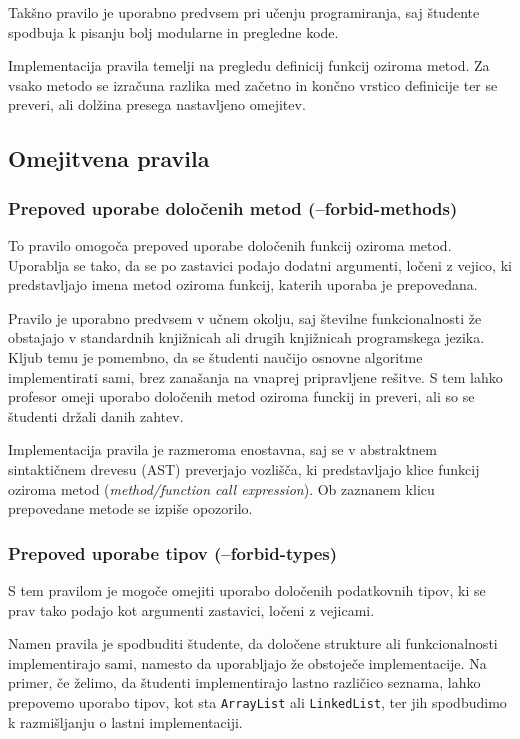 \documentclass[a4paper,12pt,openright]{book}
\begin{document}
Takšno pravilo je uporabno predvsem pri učenju programiranja, saj študente spodbuja k pisanju bolj modularne in pregledne kode.

Implementacija pravila temelji na pregledu definicij funkcij oziroma metod. Za vsako metodo se izračuna razlika med začetno in končno vrstico definicije ter se preveri, ali dolžina presega nastavljeno omejitev.

\subsection{Omejitvena pravila}

\subsubsection{Prepoved uporabe določenih metod (--forbid-methods)}

To pravilo omogoča prepoved uporabe določenih funkcij oziroma metod. Uporablja se tako, da se po zastavici podajo dodatni argumenti, ločeni z vejico, ki predstavljajo imena metod oziroma funkcij, katerih uporaba je prepovedana.

Pravilo je uporabno predvsem v učnem okolju, saj številne funkcionalnosti že obstajajo v standardnih knjižnicah ali drugih knjižnicah programskega jezika. Kljub temu je pomembno, da se študenti naučijo osnovne algoritme implementirati sami, brez zanašanja na vnaprej pripravljene rešitve. S tem lahko profesor omeji uporabo določenih metod oziroma funckij in preveri, ali so se študenti držali danih zahtev.

Implementacija pravila je razmeroma enostavna, saj se v abstraktnem sintaktičnem drevesu (AST) preverjajo vozlišča, ki predstavljajo klice funkcij oziroma metod (\textit{method/function call expression}). Ob zaznanem klicu prepovedane metode se izpiše opozorilo.

\subsubsection{Prepoved uporabe tipov (--forbid-types)}

S tem pravilom je mogoče omejiti uporabo določenih podatkovnih tipov, ki se prav tako podajo kot argumenti zastavici, ločeni z vejicami.

Namen pravila je spodbuditi študente, da določene strukture ali funkcionalnosti implementirajo sami, namesto da uporabljajo že obstoječe implementacije. Na primer, če želimo, da študenti implementirajo lastno različico seznama, lahko prepovemo uporabo tipov, kot sta \texttt{ArrayList} ali \texttt{LinkedList}, ter jih spodbudimo k razmišljanju o lastni implementaciji.
\end{document}
